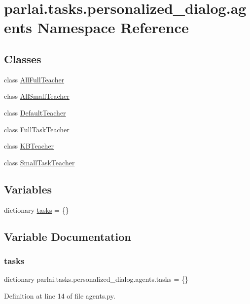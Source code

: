 \hypertarget{namespaceparlai_1_1tasks_1_1personalized__dialog_1_1agents}{}\section{parlai.\+tasks.\+personalized\+\_\+dialog.\+agents Namespace Reference}
\label{namespaceparlai_1_1tasks_1_1personalized__dialog_1_1agents}
\subsection*{Classes}
\begin{DoxyCompactItemize}
\item 
class \hyperlink{classparlai_1_1tasks_1_1personalized__dialog_1_1agents_1_1AllFullTeacher}{All\+Full\+Teacher}
\item 
class \hyperlink{classparlai_1_1tasks_1_1personalized__dialog_1_1agents_1_1AllSmallTeacher}{All\+Small\+Teacher}
\item 
class \hyperlink{classparlai_1_1tasks_1_1personalized__dialog_1_1agents_1_1DefaultTeacher}{Default\+Teacher}
\item 
class \hyperlink{classparlai_1_1tasks_1_1personalized__dialog_1_1agents_1_1FullTaskTeacher}{Full\+Task\+Teacher}
\item 
class \hyperlink{classparlai_1_1tasks_1_1personalized__dialog_1_1agents_1_1KBTeacher}{K\+B\+Teacher}
\item 
class \hyperlink{classparlai_1_1tasks_1_1personalized__dialog_1_1agents_1_1SmallTaskTeacher}{Small\+Task\+Teacher}
\end{DoxyCompactItemize}
\subsection*{Variables}
\begin{DoxyCompactItemize}
\item 
dictionary \hyperlink{namespaceparlai_1_1tasks_1_1personalized__dialog_1_1agents_a8b322496bdc1237209c183f71d5d921c}{tasks} = \{\}
\end{DoxyCompactItemize}


\subsection{Variable Documentation}
\mbox{\label{namespaceparlai_1_1tasks_1_1personalized__dialog_1_1agents_a8b322496bdc1237209c183f71d5d921c}} 
\subsubsection{\texorpdfstring{tasks}{tasks}}
{\footnotesize\ttfamily dictionary parlai.\+tasks.\+personalized\+\_\+dialog.\+agents.\+tasks = \{\}}



Definition at line 14 of file agents.\+py.

